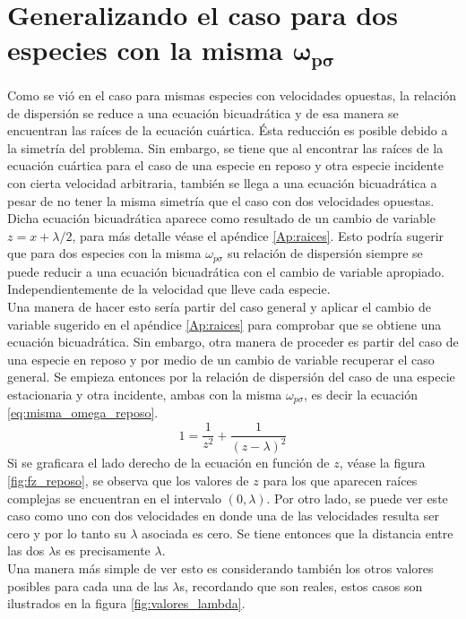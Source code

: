 \documentclass[../tesis_main_file.tex]{subfiles}
\begin{document}
\section{Generalizando el caso para dos especies con la misma $\boldsymbol{\omega_{p\sigma}}$}
Como se vió en el caso para mismas especies con velocidades opuestas, la relación de dispersión se reduce a una ecuación bicuadrática y de esa manera se encuentran las raíces de la ecuación cuártica. Ésta reducción es posible debido a la simetría del problema. Sin embargo, se tiene que al encontrar las raíces de la ecuación cuártica para el caso de una especie en reposo y otra especie incidente con cierta velocidad arbitraria, también se llega a una ecuación bicuadrática a pesar de no tener la misma simetría que el caso con dos velocidades opuestas. Dicha ecuación bicuadrática aparece como resultado de un cambio de variable $z=x+\lambda /2$, para más detalle véase el apéndice \ref{Ap:raices}. Esto podría sugerir que para dos especies con la misma $\omega_{p\sigma}$ su relación de dispersión siempre se puede reducir a una ecuación bicuadrática con el cambio de variable apropiado. Independientemente de la velocidad que lleve cada especie.\\
Una manera de hacer esto sería partir del caso general y aplicar el cambio de variable sugerido en el apéndice \ref{Ap:raices} para comprobar que se obtiene una ecuación bicuadrática. Sin embargo, otra manera de proceder es partir del caso de una especie en reposo y por medio de un cambio de variable recuperar el caso general.
Se empieza entonces por la relación de dispersión del caso de una especie estacionaria y otra incidente, ambas con la misma $\omega_{p\sigma}$, es decir la ecuación \ref{eq:misma_omega_reposo}.
\begin{equation*}
1 = \frac{1}{z^2} + \frac{1}{(z-\lambda)^2}
\end{equation*}
Si se graficara el lado derecho de la ecuación en función de $z$, véase la figura \ref{fig:fz_reposo}, se observa que los valores de $z$ para los que aparecen raíces complejas se encuentran en el intervalo $(0, \lambda)$. Por otro lado, se puede ver este caso como uno con dos velocidades en donde una de las velocidades resulta ser cero y por lo tanto su $\lambda$ asociada es cero. Se tiene entonces que la distancia entre las dos $\lambda$s es precisamente $\lambda$.\\
Una manera más simple de ver esto es considerando también los otros valores posibles para cada una de las $\lambda$s, recordando que son reales, estos casos son ilustrados en la figura \ref{fig:valores_lambda}.
\end{document}
